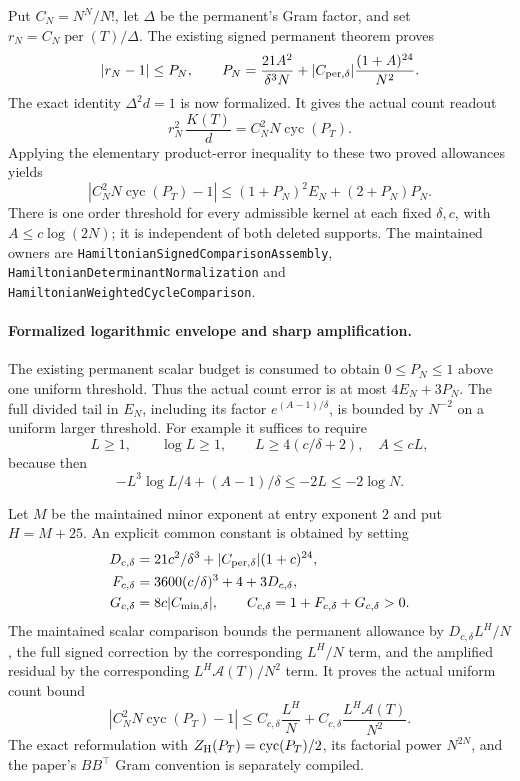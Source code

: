 Put \(C_N=N^N/N!\), let \(\Delta\) be the permanent's Gram factor,
and set \(r_N=C_N\operatorname{per}(T)/\Delta\).
The existing signed permanent theorem proves
\[
 |r_N-1|\leq P_N,\qquad
 P_N=\frac{21A^2}{\delta^3N}
       +|C_{\rm per,\delta}|\frac{(1+A)^{24}}{N^2}.
\]
The exact identity \(\Delta^2d=1\) is now formalized.
It gives the actual count readout
\[
 r_N^2\,\frac{K(T)}d
      =C_N^2N\operatorname{cyc}(P_T).
\]
Applying the elementary product-error inequality to these two
proved allowances yields
\[
 \boxed{\quad
 \left|C_N^2N\operatorname{cyc}(P_T)-1\right|
 \leq(1+P_N)^2E_N+(2+P_N)P_N .
 \quad}
\]
There is one order threshold for every admissible kernel at each fixed
\(\delta,c\), with \(A\leq c\log(2N)\); it is independent of both
deleted supports.  The maintained owners are
\texttt{HamiltonianSignedComparisonAssembly},
\texttt{HamiltonianDeterminantNormalization} and
\texttt{HamiltonianWeightedCycleComparison}.
\paragraph{Formalized logarithmic envelope and sharp amplification.}
The existing permanent scalar budget is consumed to obtain
\(0\leq P_N\leq1\) above one uniform threshold.  Thus the actual count
error is at most \(4E_N+3P_N\).
The full divided tail in \(E_N\), including its factor
\(e^{(A-1)/\delta}\), is bounded by \(N^{-2}\) on a uniform larger
threshold.  For example it suffices to require
\[
 L\geq1,\qquad \log L\geq1,\qquad
 L\geq4(c/\delta+2),
 \quad A\leq cL,
\]
because then
\[
 -L^3\log L/4+(A-1)/\delta
       \leq-2L\leq-2\log N .
\]

Let \(M\) be the maintained minor exponent at entry exponent \(2\)
and put \(H=M+25\).  An explicit common constant is obtained by setting
\[
 \begin{split}
 D_{c,\delta}
   &=21c^2/\delta^3+|C_{\rm per,\delta}|(1+c)^{24},\\
 F_{c,\delta}
   &=3600(c/\delta)^3+4+3D_{c,\delta},\\
 G_{c,\delta}
   &=8c|C_{\rm min,\delta}|,\qquad
 C_{c,\delta}=1+F_{c,\delta}+G_{c,\delta}>0 .
 \end{split}
\]
The maintained scalar comparison bounds the permanent allowance by
\(D_{c,\delta}L^H/N\), the full signed correction by the corresponding
\(L^H/N\) term, and the amplified residual by the corresponding
\(L^H\mathcal A(T)/N^2\) term.  It proves the actual uniform count bound
\[
 \left|C_N^2N\operatorname{cyc}(P_T)-1\right|
 \leq C_{c,\delta}\frac{L^H}{N}
       +C_{c,\delta}\frac{L^H\mathcal A(T)}{N^2}.
\]
The exact reformulation with \(Z_{\rm H}(P_T)=
\operatorname{cyc}(P_T)/2\), its factorial power \(N^{2N}\), and the
paper's \(BB^\top\) Gram convention is separately compiled.

